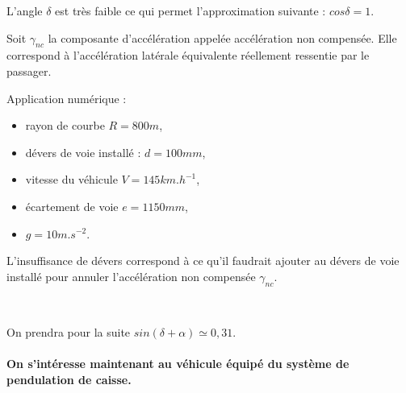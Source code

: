 L'angle $\delta$ est très faible ce qui permet l'approximation suivante : $cos \delta = 1$.


Soit $\gamma_{nc}$ la composante d'accélération appelée accélération non compensée. Elle correspond à l'accélération latérale équivalente réellement ressentie par le passager.



Application numérique :
\begin{itemize}
 \item rayon de courbe $R=800m$,
 \item dévers de voie installé : $d=100mm$,
 \item vitesse du véhicule $V=145km.h^{-1}$,
 \item écartement de voie $e=1150mm$,
 \item $g=10m.s^{-2}$.
\end{itemize}



L'insuffisance de dévers correspond à ce qu'il faudrait ajouter au dévers de voie installé pour annuler l'accélération non compensée $\gamma_{nc}$.


~\

On prendra pour la suite $sin(\delta+\alpha)\simeq0,31$.

\paragraph{On s'intéresse maintenant au véhicule équipé du système de pendulation de caisse.}

~\

